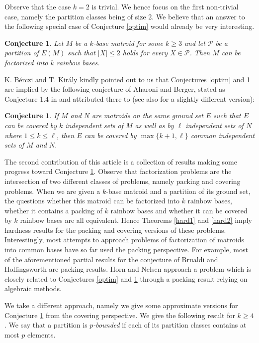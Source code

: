 \documentclass{article}
\newtheorem{Conjecture}[Statement]{Conjecture}
\begin{document}
Observe that the case $k=2$ is trivial. We hence focus on the first non-trivial case, namely the partition classes being of size 2. We believe that an answer to the following special case of Conjecture \ref{optim} would already be very interesting.

\begin{Conjecture}\label{optim2}
Let $M$ be a $k$-base matroid for some $k \geq 3$ and let $\mathcal{P}$ be a partition of $E(M)$ such that $|X|\leq 2$ holds for every $X \in \mathcal{P}$. Then $M$ can be factorized into $k$ rainbow bases.
\end{Conjecture}


K. Bérczi and T. Király kindly pointed out to us that Conjectures \ref{optim} and \ref{optim2}
are implied by the following conjecture of Aharoni and Berger, stated as
Conjecture 1.4 in \cite{ABZ} and attributed there to \cite{AB} (see
also \cite[Conjecture~1.5]{AH} for a slightly different version):
\begin{Conjecture}\label{ahconj}
If $M$ and $N$ are matroids on the same ground set $E$ such that $E$ can
be covered by $k$ independent sets of $M$ as well as by $\ell$
independent sets of $N$ where $1\leq k\leq\ell$, then $E$ can be
covered by $\max\{k+1,\ell\}$ common independent sets of $M$ and $N$.
\end{Conjecture}

The second contribution of this article is a collection of results making some progress toward Conjecture \ref{optim2}. Observe that factorization problems are the intersection of two different classes of problems, namely packing and covering problems. When we are given a $k$-base matroid and a partition of its ground set, the questions whether this matroid can be factorized into $k$ rainbow bases, whether it contains a packing of $k$ rainbow bases and whether it can be covered by $k$ rainbow bases are all equivalent. Hence Theorems \ref{hard1} and \ref{hard2} imply hardness results for the packing and covering versions of these problems. Interestingly, most attempts to approach problems of factorization of matroids  into common bases have so far used the packing perspective. For example, most of the aforementioned partial results for the conjecture of Brualdi and Hollingsworth are packing results. Horn and Nelsen \cite{hn} approach a problem which is closely related to Conjectures \ref{optim} and \ref{optim2} through a packing result relying on algebraic methods.

We take a different approach, namely we give some approximate versions for Conjecture \ref{optim2} from the covering perspective. We give the following result for $k \geq 4$. We say that a partition is {\it $p$-bounded} if each of its partition classes contains at most $p$ elements.
\end{document}
